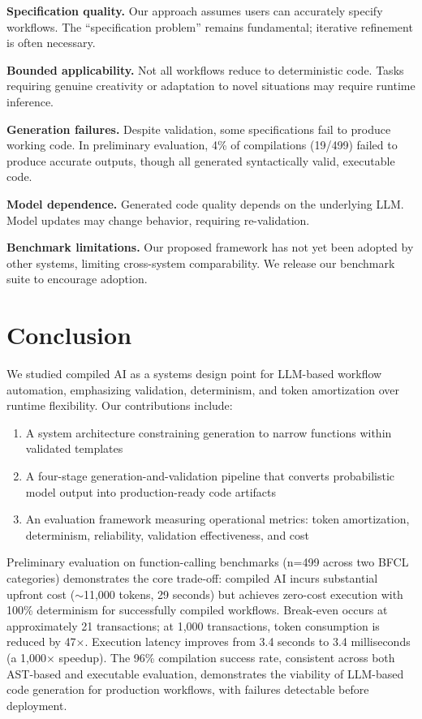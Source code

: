 \documentclass[11pt]{article}
\begin{document}
\textbf{Specification quality.} Our approach assumes users can accurately specify workflows. The ``specification problem'' remains fundamental; iterative refinement is often necessary.

\textbf{Bounded applicability.} Not all workflows reduce to deterministic code. Tasks requiring genuine creativity or adaptation to novel situations may require runtime inference.

\textbf{Generation failures.} Despite validation, some specifications fail to produce working code. In preliminary evaluation, 4\% of compilations (19/499) failed to produce accurate outputs, though all generated syntactically valid, executable code.

\textbf{Model dependence.} Generated code quality depends on the underlying LLM. Model updates may change behavior, requiring re-validation.

\textbf{Benchmark limitations.} Our proposed framework has not yet been adopted by other systems, limiting cross-system comparability. We release our benchmark suite to encourage adoption.

\section{Conclusion}
\label{sec:conclusion}

We studied compiled AI as a systems design point for LLM-based workflow automation, emphasizing validation, determinism, and token amortization over runtime flexibility. Our contributions include:

\begin{enumerate}
    \item A system architecture constraining generation to narrow functions within validated templates
    \item A four-stage generation-and-validation pipeline that converts probabilistic model output into production-ready code artifacts
    \item An evaluation framework measuring operational metrics: token amortization, determinism, reliability, validation effectiveness, and cost
\end{enumerate}

Preliminary evaluation on function-calling benchmarks (n=499 across two BFCL categories) demonstrates the core trade-off: compiled AI incurs substantial upfront cost ($\sim$11,000 tokens, 29 seconds) but achieves zero-cost execution with 100\% determinism for successfully compiled workflows. Break-even occurs at approximately 21 transactions; at 1,000 transactions, token consumption is reduced by 47$\times$. Execution latency improves from 3.4 seconds to 3.4 milliseconds (a 1,000$\times$ speedup). The 96\% compilation success rate, consistent across both AST-based and executable evaluation, demonstrates the viability of LLM-based code generation for production workflows, with failures detectable before deployment.
\end{document}
